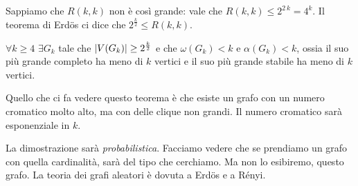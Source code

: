 Sappiamo che $R(k,k)$ non \`e cos\`i grande: vale che $R(k,k) \le 2^{2 \, k} = 4^k$.
Il teorema di Erd\"os ci dice che $2^{\frac{k}{2}} \le R(k,k)$.

\begin{theorem}[di Erd\"os]
	$\forall k \ge 4$ $\exists G_k$ tale che $\left\lvert{V(G_k)}\right\rvert \ge 2^{\frac{k}{2}}$ e che $\omega(G_k) < k$ e $\alpha(G_k) < k$, ossia il suo pi\`u grande completo ha meno di $k$ vertici e il suo pi\`u grande stabile ha meno di $k$ vertici.
\end{theorem}
Quello che ci fa vedere questo teorema \`e che esiste un grafo con un numero cromatico molto alto, ma con delle clique non grandi.
Il numero cromatico sar\`a esponenziale in $k$.

La dimostrazione sar\`a \emph{probabilistica}.
Facciamo vedere che se prendiamo un grafo con quella cardinalit\`a, sar\`a del tipo che cerchiamo.
Ma non lo esibiremo, questo grafo.
La teoria dei grafi aleatori \`e dovuta a Erd\"os e a R\'enyi.

